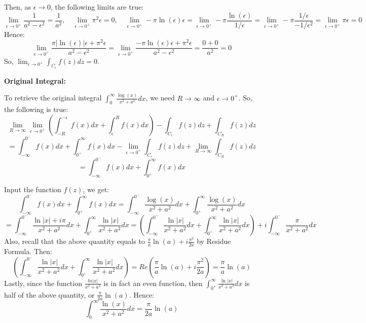 \documentclass{article}
\begin{document}
Then, as $\epsilon\rightarrow 0$, the following limits are true:
$$\lim_{\epsilon\rightarrow 0^+}\frac{1}{a^2-\epsilon^2} = \frac{1}{a^2},\quad \lim_{\epsilon\rightarrow 0^+}\pi^2\epsilon = 0,\quad \lim_{\epsilon\rightarrow 0^+}-\pi\ln(\epsilon)\epsilon = \lim_{\epsilon\rightarrow 0^+}-\pi\frac{\ln(\epsilon)}{1/\epsilon} = \lim_{\epsilon\rightarrow 0^+}-\pi\frac{1/\epsilon}{-1/\epsilon^2} = \lim_{\epsilon\rightarrow 0^+}\pi \epsilon = 0$$
Hence:
$$\lim_{\epsilon\rightarrow 0^+}\frac{\pi|\ln(\epsilon)|\epsilon +\pi^2\epsilon}{a^2-\epsilon^2} = \lim_{\epsilon\rightarrow 0^+}\frac{-\pi\ln(\epsilon)\epsilon +\pi^2\epsilon}{a^2-\epsilon^2} = \frac{0+0}{a^2}=0$$
So, $\lim_{\epsilon\rightarrow 0^+}\int_{C_\epsilon}f(z)dz = 0$.

\hfil

\textbf{Original Integral:}

To retrieve the original integral $\int_{0}^{\infty}\frac{\log(x)}{x^2+a^2}dx$, we need $R\rightarrow\infty$ and $\epsilon\rightarrow 0^+$. So, the following is true:
$$\lim_{R\rightarrow\infty}\lim_{\epsilon\rightarrow 0^+}\left(\int_{-R}^{-\epsilon}f(x)dx+\int_{\epsilon}^{R}f(x)dx\right) - \int_{C_\epsilon}f(z)dz + \int_{C_R}f(z)dz$$
$$ = \int_{-\infty}^{0^-}f(x)dx + \int_{0^+}^{\infty}f(x)dx - \lim_{\epsilon\rightarrow 0^+}\int_{C_\epsilon}f(z)dz + \lim_{R\rightarrow\infty}\int_{C_R}f(z)dz$$
$$ = \int_{-\infty}^{0^-}f(x)dx + \int_{0^+}^{\infty}f(x)dx$$

Input the function $f(z)$, we get:
$$\int_{-\infty}^{0^-}f(x)dx + \int_{0^+}^{\infty}f(x)dx = \int_{-\infty}^{0^-}\frac{\log(x)}{x^2+a^2}dx + \int_{0^+}^{\infty}\frac{\log(x)}{x^2+a^2}dx$$
$$=\int_{-\infty}^{0^-}\frac{\ln|x|+i\pi}{x^2+a^2}dx + \int_{0^+}^{\infty}\frac{\ln|x|}{x^2+a^2}dx = \left(\int_{-\infty}^{0^-}\frac{\ln|x|}{x^2+a^2}dx + \int_{0^+}^{\infty}\frac{\ln|x|}{x^2+a^2}dx\right)+i\int_{-\infty}^{0^-}\frac{\pi}{x^2+a^2}dx$$
Also, recall that the above quantity equals to $\frac{\pi}{a}\ln(a)+i\frac{\pi^2}{2a}$ by Residue Formula. Then:
$$\left(\int_{-\infty}^{0^-}\frac{\ln|x|}{x^2+a^2}dx + \int_{0^+}^{\infty}\frac{\ln|x|}{x^2+a^2}dx\right) = Re\left(\frac{\pi}{a}\ln(a)+i\frac{\pi^2}{2a}\right) = \frac{\pi}{a}\ln(a)$$
Lastly, since the function $\frac{ln|x|}{x^2+a^2}$ is in fact an even function, then $\int_{0^+}^{\infty}\frac{\ln|x|}{x^2+a^2}dx$ is half of the above quantity, or $\frac{\pi}{2a}\ln(a)$.
Hence:
$$\int_{0}^{\infty}\frac{\ln(x)}{x^2+a^2}dx = \frac{\pi}{2a}\ln(a)$$

\hfil

\hfil
\end{document}

